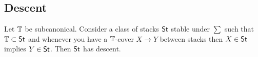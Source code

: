 %	
%	
%	
%	

\subsection{Descent}


\begin{theorem}
	Let $\mathbb{T}$ be subcanonical.
	Consider a class of stacks $\mathsf{St}$ stable under $\sum$ such that $\mathbb{T} \subset \mathsf{St}$ and whenever you have a $\mathbb{T}$-cover $X \to Y$ between stacks then $X \in \mathsf{St}$ implies $Y \in \mathsf{St}$.
	Then $\mathsf{St}$ has descent.
\end{theorem}

